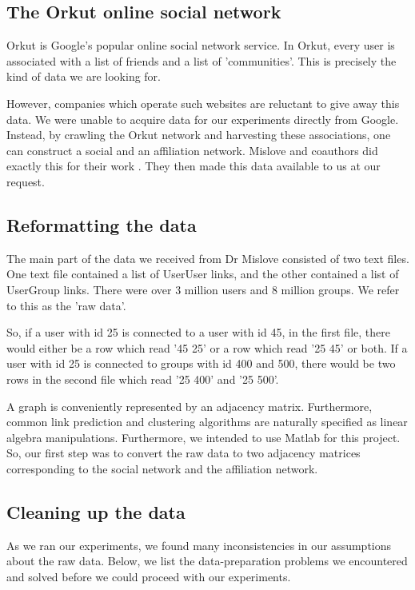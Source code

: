 \documentclass{report}
\begin{document}
\subsection{The Orkut online social network}
Orkut is Google's popular online social network service. In Orkut, every user is associated with a list of friends and a list of 'communities'. This is precisely the kind of data we are looking for.

However, companies which operate such websites are reluctant to give away this data. We were unable to acquire data for our experiments directly from Google. Instead, by crawling the Orkut network and harvesting these associations, one can construct a social and an affiliation network. Mislove and coauthors did exactly this for their work \cite{mislove-2007-socialnetworks}. They then made this data available to us at our request.

\subsection{Reformatting the data}
The main part of the data we received from Dr Mislove consisted of two text files. One text file contained a list of UserUser links, and the other contained a list of UserGroup links. There were over 3 million users and 8 million groups. We refer to this as the 'raw data'.

So, if a user with id 25 is connected to a user with id 45, in the first file, there would either be a row which read '45 25' or a row which read '25 45' or both. If a user with id 25 is connected to groups with id 400 and 500, there would be two rows in the second file which read '25 400' and '25 500'.

A graph is conveniently represented by an adjacency matrix. Furthermore, common link prediction and clustering algorithms are naturally specified as linear algebra manipulations. Furthermore, we intended to use Matlab for this project. So, our first step was to convert the raw data to two adjacency matrices corresponding to the social network and the affiliation network.

\subsection{Cleaning up the data}
As we ran our experiments, we found many inconsistencies in our assumptions about the raw data. Below, we list the data-preparation problems we encountered and solved before we could proceed with our experiments.
\end{document}
